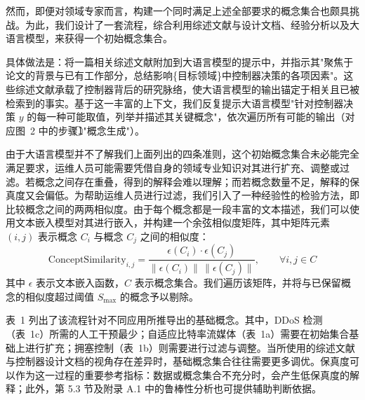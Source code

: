 \documentclass[11pt,a4paper]{article}
\begin{document}
然而，即便对领域专家而言，构建一个同时满足上述全部要求的概念集合也颇具挑战。为此，我们设计了一套流程，综合利用综述文献与设计文档、经验分析以及大语言模型，来获得一个初始概念集合。

具体做法是：将一篇相关综述文献附加到大语言模型的提示中，并指示其"聚焦于论文的背景与已有工作部分，总结影响\{目标领域\}中控制器决策的各项因素"。这些综述文献承载了控制器背后的研究脉络，使大语言模型的输出锚定于相关且已被检索到的事实。基于这一丰富的上下文，我们反复提示大语言模型"针对控制器决策 $y$ 的每一种可能取值，列举并描述其关键概念"，依次遍历所有可能的输出（对应图~2 中的步骤\textcircled{1}"概念生成"）。

由于大语言模型并不了解我们上面列出的四条准则，这个初始概念集合未必能完全满足要求，运维人员可能需要凭借自身的领域专业知识对其进行扩充、调整或过滤。若概念之间存在重叠，得到的解释会难以理解；而若概念数量不足，解释的保真度又会偏低。为帮助运维人员进行过滤，我们引入了一种经验性的检验方法，即比较概念之间的两两相似度。由于每个概念都是一段丰富的文本描述，我们可以使用文本嵌入模型对其进行嵌入，并构建一个余弦相似度矩阵，其中矩阵元素 $(i,j)$ 表示概念 $C_i$ 与概念 $C_j$ 之间的相似度：
\begin{equation}
\text{ConceptSimilarity}_{i,j} = \frac{\epsilon(C_i)\cdot\epsilon(C_j)}{\lVert\epsilon(C_i)\rVert\,\lVert\epsilon(C_j)\rVert}, \qquad \forall i,j\in C
\label{eq:concept-sim}
\end{equation}
其中 $\epsilon$ 表示文本嵌入函数，$C$ 表示概念集合。我们遍历该矩阵，并将与已保留概念的相似度超过阈值 $S_{\max}$ 的概念予以剔除。

表~1 列出了该流程针对不同应用所推导出的基础概念。其中，DDoS 检测（表~1c）所需的人工干预最少；自适应比特率流媒体（表~1a）需要在初始集合基础上进行扩充；拥塞控制（表~1b）则需要进行过滤与调整。当所使用的综述文献与控制器设计文档的视角存在差异时，基础概念集合往往需要更多调优。保真度可以作为这一过程的重要参考指标：数据或概念集合不充分时，会产生低保真度的解释；此外，第 5.3 节及附录 A.1 中的鲁棒性分析也可提供辅助判断依据。
\end{document}
